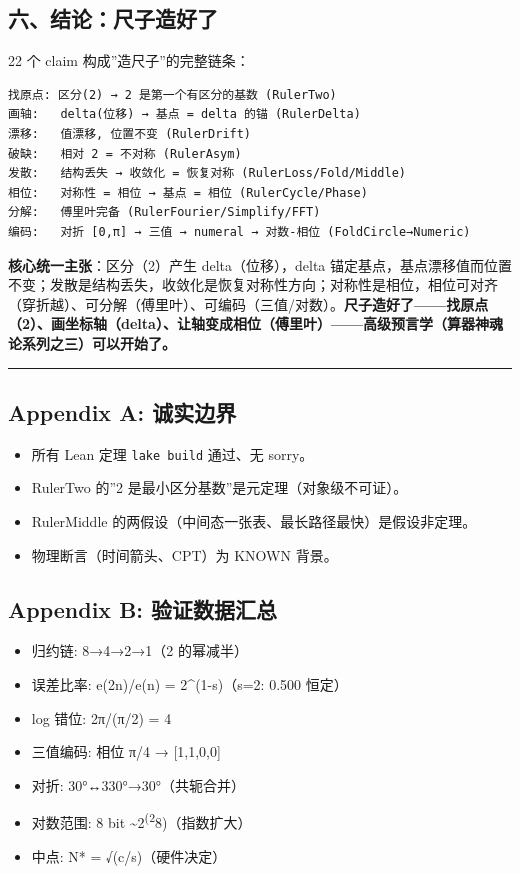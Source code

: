 \documentclass[
]{article}
\providecommand{\tightlist}{%
  \setlength{\itemsep}{0pt}\setlength{\parskip}{0pt}}
\begin{document}
\subsection{六、结论：尺子造好了}\label{ux516dux7ed3ux8bbaux5c3aux5b50ux9020ux597dux4e86}

22 个 claim 构成''造尺子''的完整链条：

\begin{verbatim}
找原点: 区分(2) → 2 是第一个有区分的基数 (RulerTwo)
画轴:   delta(位移) → 基点 = delta 的锚 (RulerDelta)
漂移:   值漂移, 位置不变 (RulerDrift)
破缺:   相对 2 = 不对称 (RulerAsym)
发散:   结构丢失 → 收敛化 = 恢复对称 (RulerLoss/Fold/Middle)
相位:   对称性 = 相位 → 基点 = 相位 (RulerCycle/Phase)
分解:   傅里叶完备 (RulerFourier/Simplify/FFT)
编码:   对折 [0,π] → 三值 → numeral → 对数-相位 (FoldCircle→Numeric)
\end{verbatim}

\textbf{核心统一主张}：区分（2）产生 delta（位移），delta
锚定基点，基点漂移值而位置不变；发散是结构丢失，收敛化是恢复对称性方向；对称性是相位，相位可对齐（穿折越）、可分解（傅里叶）、可编码（三值/对数）。\textbf{尺子造好了------找原点（2）、画坐标轴（delta）、让轴变成相位（傅里叶）------高级预言学（算器神魂论系列之三）可以开始了。}

\begin{center}\rule{0.5\linewidth}{0.5pt}\end{center}

\subsection{Appendix A:
诚实边界}\label{appendix-a-ux8bdaux5b9eux8fb9ux754c}

\begin{itemize}
\tightlist
\item
  所有 Lean 定理 \texttt{lake\ build} 通过、无 sorry。
\item
  RulerTwo 的''2 是最小区分基数''是元定理（对象级不可证）。
\item
  RulerMiddle 的两假设（中间态一张表、最长路径最快）是假设非定理。
\item
  物理断言（时间箭头、CPT）为 KNOWN 背景。
\end{itemize}

\subsection{Appendix B:
验证数据汇总}\label{appendix-b-ux9a8cux8bc1ux6570ux636eux6c47ux603b}

\begin{itemize}
\tightlist
\item
  归约链: 8→4→2→1（2 的幂减半）
\item
  误差比率: e(2n)/e(n) = 2\^{}(1-s)（s=2: 0.500 恒定）
\item
  log 错位: 2π/(π/2) = 4
\item
  三值编码: 相位 π/4 → {[}1,1,0,0{]}
\item
  对折: 30°↔330°→30°（共轭合并）
\item
  对数范围: 8 bit \textasciitilde2\textsuperscript{(2}8)（指数扩大）
\item
  中点: N* = √(c/s)（硬件决定）
\end{itemize}
\end{document}
